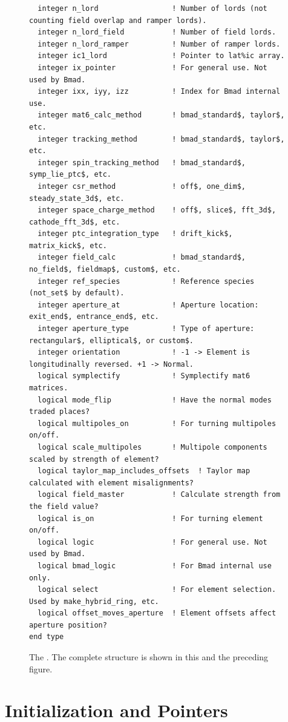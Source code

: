 \begin{figure}[tb]
\begin{verbatim}
  integer n_lord                 ! Number of lords (not counting field overlap and ramper lords).
  integer n_lord_field           ! Number of field lords.
  integer n_lord_ramper          ! Number of ramper lords.
  integer ic1_lord               ! Pointer to lat%ic array.
  integer ix_pointer             ! For general use. Not used by Bmad.
  integer ixx, iyy, izz          ! Index for Bmad internal use.
  integer mat6_calc_method       ! bmad_standard$, taylor$, etc.
  integer tracking_method        ! bmad_standard$, taylor$, etc.
  integer spin_tracking_method   ! bmad_standard$, symp_lie_ptc$, etc.
  integer csr_method             ! off$, one_dim$, steady_state_3d$, etc.
  integer space_charge_method    ! off$, slice$, fft_3d$, cathode_fft_3d$, etc.
  integer ptc_integration_type   ! drift_kick$, matrix_kick$, etc.
  integer field_calc             ! bmad_standard$, no_field$, fieldmap$, custom$, etc.
  integer ref_species            ! Reference species (not_set$ by default).
  integer aperture_at            ! Aperture location: exit_end$, entrance_end$, etc.
  integer aperture_type          ! Type of aperture: rectangular$, elliptical$, or custom$.
  integer orientation            ! -1 -> Element is longitudinally reversed. +1 -> Normal.
  logical symplectify            ! Symplectify mat6 matrices.
  logical mode_flip              ! Have the normal modes traded places?
  logical multipoles_on          ! For turning multipoles on/off.
  logical scale_multipoles       ! Multipole components scaled by strength of element?
  logical taylor_map_includes_offsets  ! Taylor map calculated with element misalignments?
  logical field_master           ! Calculate strength from the field value?
  logical is_on                  ! For turning element on/off.
  logical logic                  ! For general use. Not used by Bmad.
  logical bmad_logic             ! For Bmad internal use only.
  logical select                 ! For element selection. Used by make_hybrid_ring, etc.
  logical offset_moves_aperture  ! Element offsets affect aperture position?
end type
\end{verbatim}
\caption[The  (part 2).]{The . 
The complete structure is shown in this and the preceding figure.}
\label{f:ele.struct2}
\end{figure}

\section{Initialization and Pointers}

